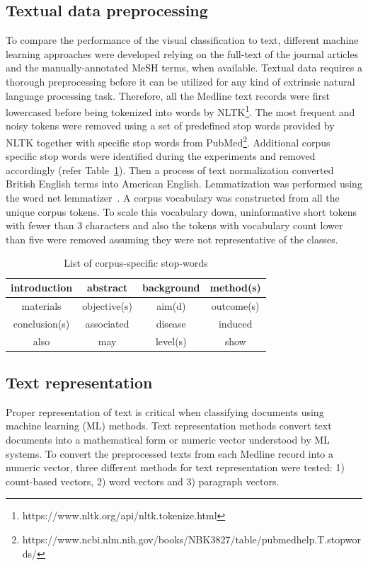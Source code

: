 \documentclass[]{spie}  %
\begin{document}
\subsection{Textual data preprocessing}
\label{subsec:text_preprocess}
%
To compare the performance of the visual classification to text, different machine learning approaches were developed relying on the full-text of the journal articles and the manually-annotated MeSH terms, when available. 
Textual data requires a thorough preprocessing before it can be utilized for any kind of extrinsic natural language processing task.
Therefore, all the Medline text records were first lowercased before being tokenized into words by NLTK\footnote{https://www.nltk.org/api/nltk.tokenize.html}.
The most frequent and noisy tokens were removed using a set of predefined stop words provided by NLTK together with specific stop words from PubMed\footnote{https://www.ncbi.nlm.nih.gov/books/NBK3827/table/pubmedhelp.T.stopwords/}. 
Additional corpus specific stop words were identified during the experiments and removed accordingly (refer Table~\ref{tab:stopwords}). 
Then a process of text normalization converted British English terms into American English. 
Lemmatization was performed using the word net lemmatizer~\cite{pmid22464129}.
A corpus vocabulary was constructed from all the unique corpus tokens. 
To scale this vocabulary down, uninformative short tokens with fewer than 3 characters and also the tokens with vocabulary count lower than five were removed assuming they were not representative of the classes.
%
\begin{table}[ht]
\caption{List of corpus-specific stop-words}
\label{tab:stopwords}
    \centering
    \begin{tabular}{|c|c|c|c|}
    \hline
        introduction & abstract & background & method(s) \\
    \hline
        materials & objective(s) & aim(d) & outcome(s) \\
    \hline
        conclusion(s) & associated & disease & induced \\
    \hline
        also & may & level(s) & show \\
    \hline
    \end{tabular}
\end{table}
%
\subsection{Text representation}
\label{subsec:textrep}
%
Proper representation of text is critical when classifying documents using machine learning (ML) methods.
Text representation methods convert text documents into a mathematical form or numeric vector understood by ML systems.
To convert the preprocessed texts from each Medline record into a numeric vector, three different methods for text representation were tested: 1) count-based vectors, 2) word vectors and 3) paragraph vectors. 
\end{document}
